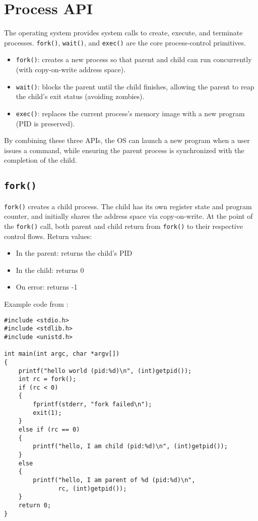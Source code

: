 \section{Process API}
The operating system provides system calls to create, execute, and terminate processes.
\texttt{fork()}, \texttt{wait()}, and \texttt{exec()} are the core process-control primitives.
\begin{itemize}
    \item \texttt{fork()}: creates a new process so that parent and child can run concurrently (with copy-on-write address space).
    \item \texttt{wait()}: blocks the parent until the child finishes, allowing the parent to reap the child's exit status (avoiding zombies).
    \item \texttt{exec()}: replaces the current process's memory image with a new program (PID is preserved).
\end{itemize}
By combining these three APIs, the OS can launch a new program
when a user issues a command, while ensuring the parent process is synchronized
with the completion of the child.

\subsection{\texttt{fork()}}
\texttt{fork()} creates a child process. The child has its own register state and program counter, and initially shares the
address space via copy-on-write. At the point of the \texttt{fork()} call, both parent and child return from \texttt{fork()}
to their respective control flows. Return values:
\begin{itemize}
    \item In the parent: returns the child's PID
    \item In the child: returns 0
    \item On error: returns -1
\end{itemize}

Example code from \cite{ArpaciDusseau23-Book}:
\begin{center}
    \begin{minipage}{0.9\linewidth}
        \begin{verbatim}
#include <stdio.h>
#include <stdlib.h>
#include <unistd.h>

int main(int argc, char *argv[])
{
    printf("hello world (pid:%d)\n", (int)getpid());
    int rc = fork();
    if (rc < 0)
    {
        fprintf(stderr, "fork failed\n");
        exit(1);
    }
    else if (rc == 0)
    {
        printf("hello, I am child (pid:%d)\n", (int)getpid());
    }
    else
    {
        printf("hello, I am parent of %d (pid:%d)\n",
               rc, (int)getpid());
    }
    return 0;
}
\end{verbatim}
    \end{minipage}
\end{center}

